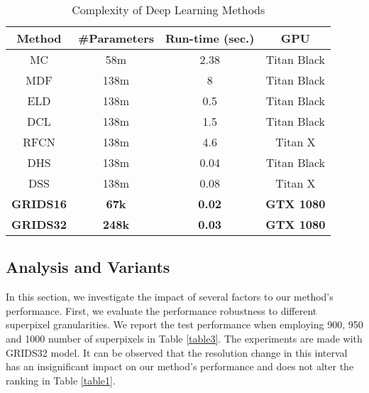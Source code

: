 \documentclass[a4paper,conference]{IEEEtran}
\begin{document}
\begin{table}[!t]
\renewcommand{\arraystretch}{1.3}

\caption{Complexity of Deep Learning Methods}
\label{table2}
\centering
\begin{tabular}{|c||c||c||c|}
\hline
Method & \#Parameters & Run-time (sec.) & GPU\\
\hline
MC & 58m & 2.38 & Titan Black\\\hline
MDF & 138m & 8 & Titan Black\\\hline
ELD & 138m & 0.5 & Titan Black\\\hline
DCL & 138m & 1.5 & Titan Black\\\hline
RFCN & 138m & 4.6 & Titan X\\\hline
DHS & 138m & 0.04 & Titan Black\\\hline
DSS & 138m & 0.08 & Titan X\\\hline
\textbf{GRIDS16} & \textbf{67k} & \textbf{0.02} & \textbf{GTX 1080}\\\hline
\textbf{GRIDS32} & \textbf{248k} & \textbf{0.03} & \textbf{GTX 1080}\\\hline

\end{tabular}
\end{table}

\subsection{Analysis and Variants}
In this section, we investigate the impact of several factors to our method's performance.
First, we evaluate the performance robustness to different superpixel granularities.
We report the test performance when employing 900, 950 and 1000 number of superpixels in Table \ref{table3}.
The experiments are made with GRIDS32 model.
It can be observed that the resolution change in this interval has an insignificant impact on our method's performance and does not alter the ranking in Table \ref{table1}.
\end{document}
